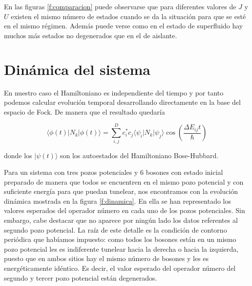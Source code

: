 \documentclass[11pt,a4paper]{article}
\begin{document}
En las figuras \ref{f:comparacion} puede observarse que para diferentes valores de $J$ y $U$ existen el mismo número de estados cuando se da la situación para que se esté en el mismo régimen. Además puede verse como en el estado de superfluido hay muchos más estados no degenerados que en el de aislante.

\section{Dinámica del sistema}

En nuestro caso el Hamiltoniano es independiente del tiempo y por tanto podemos calcular evolución temporal desarrollando directamente en la base del espacio de Fock. De manera que el resultado quedaría

\begin{equation}
  \langle\phi(t)|N_k|\phi(t)\rangle=\sum_{i,j}^{D}c_i^*c_j\langle\psi_i|N_k|\psi_j\rangle \cos(\frac{\Delta E_{ij}t}{\hbar})
\end{equation}

donde los $|\psi(t)\rangle$ son los autoestados del Hamiltoniano Bose-Hubbard.

Para un sistema con tres pozos potenciales y 6 bosones con estado inicial preparado de manera que todos se encuentren en el mismo pozo potencial y con suficiente energía para que puedan tunelear, nos encontramos con la evolución dinámica mostrada en la figura \ref{f:dinamica}. En ella se han representado los valores esperados del operador número en cada uno de los pozos potenciales. Sin embargo, cabe destacar que no aparece por ningún lado los datos referentes al segundo pozo potencial. La raíz de este detalle es la condición de contorno periódica que habíamos impuesto: como todos los bosones están en un mismo pozo potencial les es indiferente tunelear hacia la derecha o hacia la izquierda, puesto que en ambos sitios hay el mismo número de bosones y les es energéticamente idéntico. Es decir, el valor esperado del operador número del segundo y tercer pozo potencial están degenerados.
\end{document}
